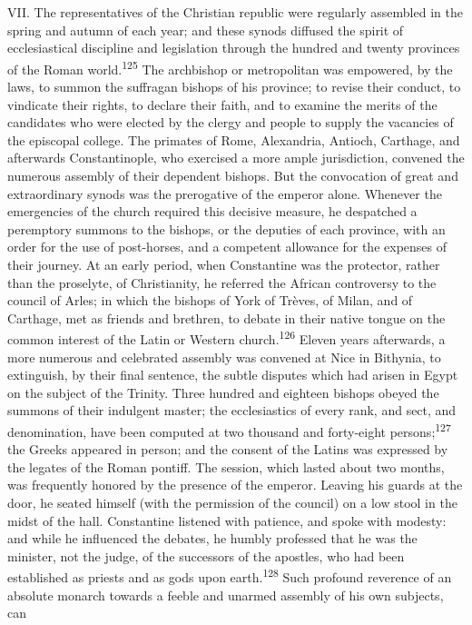 VII. The representatives of the Christian republic were regularly
assembled in the spring and autumn of each year; and these synods
diffused the spirit of ecclesiastical discipline and legislation
through the hundred and twenty provinces of the Roman world.\textsuperscript{125} The
archbishop or metropolitan was empowered, by the laws, to summon the
suffragan bishops of his province; to revise their conduct, to
vindicate their rights, to declare their faith, and to examine the
merits of the candidates who were elected by the clergy and people to
supply the vacancies of the episcopal college. The primates of Rome,
Alexandria, Antioch, Carthage, and afterwards Constantinople, who
exercised a more ample jurisdiction, convened the numerous assembly of
their dependent bishops. But the convocation of great and extraordinary
synods was the prerogative of the emperor alone. Whenever the
emergencies of the church required this decisive measure, he despatched
a peremptory summons to the bishops, or the deputies of each province,
with an order for the use of post-horses, and a competent allowance for
the expenses of their journey. At an early period, when Constantine was
the protector, rather than the proselyte, of Christianity, he referred
the African controversy to the council of Arles; in which the bishops
of York of Trèves, of Milan, and of Carthage, met as friends and
brethren, to debate in their native tongue on the common interest of
the Latin or Western church.\textsuperscript{126} Eleven years afterwards, a more
numerous and celebrated assembly was convened at Nice in Bithynia, to
extinguish, by their final sentence, the subtle disputes which had
arisen in Egypt on the subject of the Trinity. Three hundred and
eighteen bishops obeyed the summons of their indulgent master; the
ecclesiastics of every rank, and sect, and denomination, have been
computed at two thousand and forty-eight persons;\textsuperscript{127} the Greeks
appeared in person; and the consent of the Latins was expressed by the
legates of the Roman pontiff. The session, which lasted about two
months, was frequently honored by the presence of the emperor. Leaving
his guards at the door, he seated himself (with the permission of the
council) on a low stool in the midst of the hall. Constantine listened
with patience, and spoke with modesty: and while he influenced the
debates, he humbly professed that he was the minister, not the judge,
of the successors of the apostles, who had been established as priests
and as gods upon earth.\textsuperscript{128} Such profound reverence of an absolute
monarch towards a feeble and unarmed assembly of his own subjects, can
